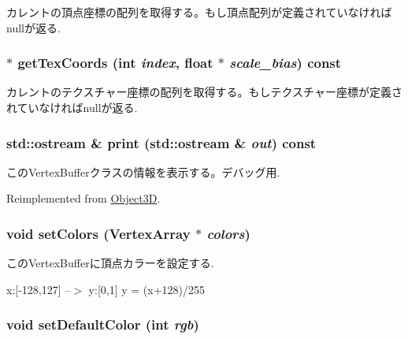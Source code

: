 カレントの頂点座標の配列を取得する。もし頂点配列が定義されていなければnullが返る. \hypertarget{classm3g_1_1VertexBuffer_9015840c09da0691c31a8aab5e09404a}{
\subsubsection[{getTexCoords}]{ $\ast$ getTexCoords (int {\em index}, \/  float $\ast$ {\em scale\_\-bias}) const}}
\label{classm3g_1_1VertexBuffer_9015840c09da0691c31a8aab5e09404a}


カレントのテクスチャー座標の配列を取得する。もしテクスチャー座標が定義されていなければnullが返る. \hypertarget{classm3g_1_1VertexBuffer_6fea17fa1532df3794f8cb39cb4f911f}{
\subsubsection[{print}]{\setlength{\rightskip}{0pt plus 5cm}std::ostream \& print (std::ostream \& {\em out}) const}}
\label{classm3g_1_1VertexBuffer_6fea17fa1532df3794f8cb39cb4f911f}


このVertexBufferクラスの情報を表示する。デバッグ用. 

Reimplemented from \hyperlink{classm3g_1_1Object3D_6fea17fa1532df3794f8cb39cb4f911f}{Object3D}.\hypertarget{classm3g_1_1VertexBuffer_e5a5933252e3ec3afa0a83698b5b3521}{
\subsubsection[{setColors}]{\setlength{\rightskip}{0pt plus 5cm}void setColors ({\bf VertexArray} $\ast$ {\em colors})}}
\label{classm3g_1_1VertexBuffer_e5a5933252e3ec3afa0a83698b5b3521}


このVertexBufferに頂点カラーを設定する.

x:\mbox{[}-128,127\mbox{]} --$>$ y:\mbox{[}0,1\mbox{]} y = (x+128)/255 \hypertarget{classm3g_1_1VertexBuffer_ba88996ea63221b09b9f841aef0270ee}{
\subsubsection[{setDefaultColor}]{\setlength{\rightskip}{0pt plus 5cm}void setDefaultColor (int {\em rgb})}}
\label{classm3g_1_1VertexBuffer_ba88996ea63221b09b9f841aef0270ee}


